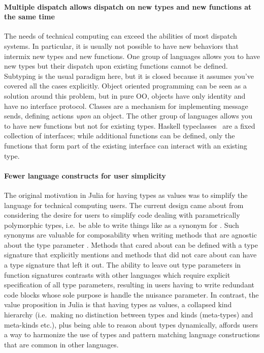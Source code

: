 \documentclass[pldi]{sigplanconf-pldi15}
\begin{document}
\paragraph{Multiple dispatch allows dispatch on new types and new functions at the same time}
The needs of technical computing can exceed the abilities of most dispatch
systems.  In particular, it is usually not possible to have new behaviors that
intermix new types and new functions.  One group of languages allows you to
have new types but their dispatch upon existing functions cannot be defined.
Subtyping is the usual paradigm here, but it is closed because it assumes
you've covered all the cases explicitly.  Object oriented programming can be
seen as a solution around this problem, but in pure OO, objects have only
identity and have no interface protocol.  Classes are a mechanism for
implementing message sends, defining actions \textit{upon} an object.  The
other group of languages allows you to have new functions but not for existing
types.  Haskell typeclasses~\cite{typeclass} are a fixed collection of
interfaces; while additional functions can be defined, only the functions that
form part of the existing interface can interact with an existing type.

\paragraph{Fewer language constructs for user simplicity}
The original motivation in Julia for having types as values was to simplify the
language for technical computing users.  The current design came about from
considering the desire for users to simplify code dealing with parametrically
polymorphic types, i.e.\ be able to write things like  as a synonym
for .  Such synonyms are valuable for composability when
writing methods that are agnostic about the type parameter .  Methods
that cared about  can be defined with a type signature that explicitly
mentions  and methods that did not care about  can have a type
signature that left it out.  The ability to leave out type parameters in
function signatures contrasts with other languages  which
require explicit specification of all type parameters, resulting in users
having to write redundant code blocks whose sole purpose is handle the nuisance
parameter.  In contrast, the value proposition in Julia is that having types as
values, a collapsed kind hierarchy (i.e.\ making no distinction between types
and kinds (meta-types) and meta-kinds etc.), plus being able to reason about
types dynamically, affords users a way to harmonize the use of types and
pattern matching language constructions that are common in other languages.
\end{document}
